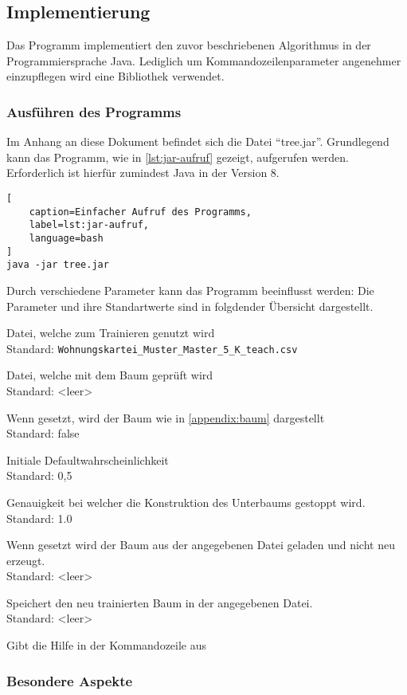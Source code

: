 \subsection{Implementierung}

Das Programm implementiert den zuvor beschriebenen Algorithmus in der Programmiersprache Java.
Lediglich um Kommandozeilenparameter angenehmer einzupflegen wird eine Bibliothek verwendet.

\subsubsection{Ausführen des Programms}
Im Anhang an diese Dokument befindet sich die Datei \enquote{tree.jar}.
Grundlegend kann das Programm, wie in \autoref{lst:jar-aufruf} gezeigt, aufgerufen werden.
Erforderlich ist hierfür zumindest Java in der Version 8.

\begin{lstlisting}[
    caption=Einfacher Aufruf des Programms,
    label=lst:jar-aufruf,
    language=bash
]
java -jar tree.jar
\end{lstlisting}

Durch verschiedene Parameter kann das Programm beeinflusst werden:
Die Parameter und ihre Standartwerte sind in folgdender Übersicht dargestellt.

\begin{description}
    \setlength\itemsep{-0.5em}
    \item[\texttt{-{}-teach, -t}]
        Datei, welche zum Trainieren genutzt wird\\
        Standard: \texttt{Wohnungskartei\_Muster\_Master\_5\_K\_teach.csv}
    \item[\texttt{-{}-check, -c}]
        Datei, welche mit dem Baum geprüft wird\\
        Standard: <leer>
    \item[\texttt{-{}-print, -p}]
        Wenn gesetzt, wird der Baum wie in \autoref{appendix:baum} dargestellt\\
        Standard: false
    \item[\texttt{-{}-default, -d}]
        Initiale Defaultwahrscheinlichkeit\\
        Standard: 0,5
    \item[\texttt{-{}-accuracy, -a}]
        Genauigkeit bei welcher die Konstruktion des Unterbaums gestoppt wird.\\
        Standard: 1.0
    \item[\texttt{-{}-use-saved-tree, -u}]
        Wenn gesetzt wird der Baum aus der angegebenen Datei geladen und nicht neu erzeugt.\\
        Standard: <leer>
    \item[\texttt{-{}-save-tree, -s}]
        Speichert den neu trainierten Baum in der angegebenen Datei.\\
        Standard: <leer>
    \item[\texttt{-{}-help}]
        Gibt die Hilfe in der Kommandozeile aus
\end{description}



\subsubsection{Besondere Aspekte}
